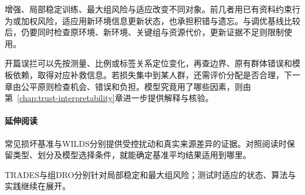 增强、局部稳定训练、最大组风险与适应改变不同对象。前几者用已有资料约束行为或加权风险，适应用新环境信息更新状态，也承担积错与遗忘。与调优基线比较后，仍要同时检查原环境、新环境、关键组与资源代价，更新证据不足则限制使用。

开篇误拦可以先按测量、比例或标签关系定位变化，再查边界、原有群体错误和模板依赖，取得对应补救信息。若损失集中到某人群，还需评价分配是否合理，下一章由公平原则检查机会、错误和负担。模型究竟用了哪些因素，则由第~\ref{chap:trust-interpretability}章进一步提供解释与核验。

\paragraph{延伸阅读}

常见损坏基准与WILDS分别提供受控扰动和真实来源差异的证据。对照阅读时保留类型、划分及模型选择条件，就能确定基准平均结果适用到哪里。

TRADES与组DRO分别针对局部稳定和最大组风险；测试时适应的状态、算法与实践继续在展开。
